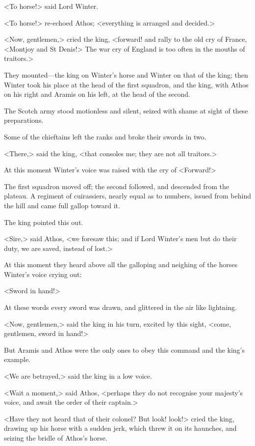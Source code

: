 <To horse!> said Lord Winter.

<To horse!> re-echoed Athos; <everything is arranged and decided.>

<Now, gentlemen,> cried the king, <forward! and rally to the old cry of France, <Montjoy and St Denis!> The war cry of England is too often in the mouths of traitors.>

They mounted—the king on Winter's horse and Winter on that of the king; then Winter took his place at the head of the first squadron, and the king, with Athos on his right and Aramis on his left, at the head of the second.

The Scotch army stood motionless and silent, seized with shame at sight of these preparations.

Some of the chieftains left the ranks and broke their swords in two.

<There,> said the king, <that consoles me; they are not all traitors.>

At this moment Winter's voice was raised with the cry of <Forward!>

The first squadron moved off; the second followed, and descended from the plateau. A regiment of cuirassiers, nearly equal as to numbers, issued from behind the hill and came full gallop toward it.

The king pointed this out.

<Sire,> said Athos, <we foresaw this; and if Lord Winter's men but do their duty, we are saved, instead of lost.>

At this moment they heard above all the galloping and neighing of the horses Winter's voice crying out:

<Sword in hand!>

At these words every sword was drawn, and glittered in the air like lightning.

<Now, gentlemen,> said the king in his turn, excited by this sight, <come, gentlemen, sword in hand!>

But Aramis and Athos were the only ones to obey this command and the king's example.

<We are betrayed,> said the king in a low voice.

<Wait a moment,> said Athos, <perhaps they do not recognise your majesty's voice, and await the order of their captain.>

<Have they not heard that of their colonel? But look! look!> cried the king, drawing up his horse with a sudden jerk, which threw it on its haunches, and seizing the bridle of Athos's horse.

